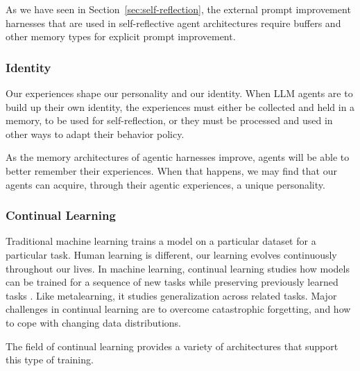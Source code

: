 As we have seen in Section~\ref{sec:self-reflection}, the external prompt improvement harnesses that are used in self-reflective agent architectures  require buffers and other memory types for explicit prompt improvement.

\subsubsection{Identity}
Our experiences shape our personality and our identity. When LLM agents are to build up their own identity, the experiences must either be collected and held in a memory, to be used for self-reflection, or they must be processed and used in other ways to adapt their behavior policy. 

As the memory architectures of agentic harnesses improve, agents will be able to better remember their experiences. When that happens, we may find that our agents can acquire, through their agentic experiences, a unique personality.

\subsubsection{Continual Learning}
Traditional machine learning trains a model on a particular dataset for a particular task. Human learning is different, our learning evolves continuously throughout our lives.
In machine learning, continual learning studies how models can be trained for a sequence of new tasks while preserving previously learned tasks \citep{wang2024comprehensive,li2025improving}. Like metalearning, it studies generalization across related tasks. Major challenges in continual learning are to overcome 
catastrophic forgetting, and how to cope with changing data distributions. 

The field of continual learning provides a  variety of architectures that support this type of training. 



